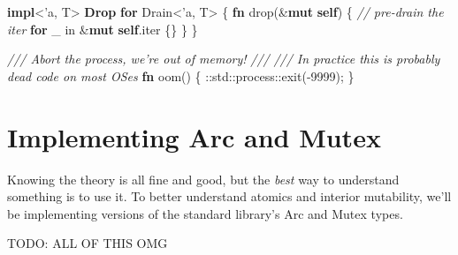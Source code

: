 \documentclass[a4paper,]{book}
\newenvironment{Shaded}{\begin{snugshade}}{\end{snugshade}}
\newcommand{\KeywordTok}[1]{\textcolor[rgb]{0.13,0.29,0.53}{\textbf{{#1}}}}
\newcommand{\DecValTok}[1]{\textcolor[rgb]{0.00,0.00,0.81}{{#1}}}
\newcommand{\CommentTok}[1]{\textcolor[rgb]{0.56,0.35,0.01}{\textit{{#1}}}}
\newcommand{\OtherTok}[1]{\textcolor[rgb]{0.56,0.35,0.01}{{#1}}}
\newcommand{\NormalTok}[1]{{#1}}
\begin{document}
\begin{Shaded}
\begin{Highlighting}[]
\KeywordTok{impl}\NormalTok{<}\OtherTok{'a}\NormalTok{, T> }\KeywordTok{Drop} \KeywordTok{for} \NormalTok{Drain<}\OtherTok{'a}\NormalTok{, T> \{}
    \KeywordTok{fn} \NormalTok{drop(&}\KeywordTok{mut} \KeywordTok{self}\NormalTok{) \{}
        \CommentTok{// pre-drain the iter}
        \KeywordTok{for} \NormalTok{_ in &}\KeywordTok{mut} \KeywordTok{self}\NormalTok{.iter \{\}}
    \NormalTok{\}}
\NormalTok{\}}

\CommentTok{/// Abort the process, we're out of memory!}
\CommentTok{///}
\CommentTok{/// In practice this is probably dead code on most OSes}
\KeywordTok{fn} \NormalTok{oom() \{}
    \NormalTok{::std::process::exit(-}\DecValTok{9999}\NormalTok{);}
\NormalTok{\}}
\end{Highlighting}
\end{Shaded}

\chapter{Implementing Arc and Mutex}\label{sec--arc-and-mutex}

Knowing the theory is all fine and good, but the \emph{best} way to
understand something is to use it. To better understand atomics and
interior mutability, we'll be implementing versions of the standard
library's Arc and Mutex types.

TODO: ALL OF THIS OMG
\end{document}
